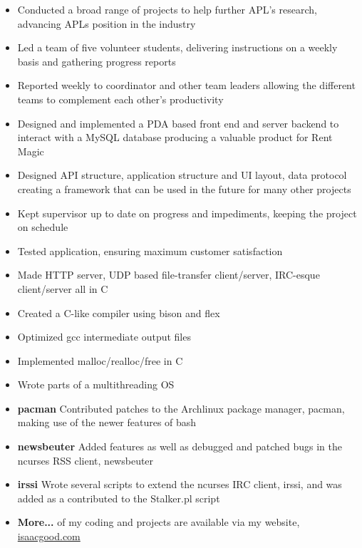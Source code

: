 \documentclass{article}
\begin{document}
      \begin{itemize}
        \item Conducted a broad range of projects to help further APL’s research, advancing APLs position in the industry
        \item Led a team of five volunteer students, delivering instructions on a weekly basis and gathering progress reports
        \item Reported weekly to coordinator and other team leaders allowing the different teams to complement each other's productivity
      \end{itemize}

      \begin{itemize}
        \item Designed and implemented a PDA based front end and server backend to interact with a MySQL database
    producing a valuable product for Rent Magic
        \item Designed API structure, application structure and UI layout, data protocol creating a framework that can be
    used in the future for many other projects
        \item Kept supervisor up to date on progress and impediments, keeping the project on schedule
        \item Tested application, ensuring maximum customer satisfaction
      \end{itemize}

    \begin{itemize}
      \item Made HTTP server, UDP based file-transfer client/server, IRC-esque client/server all in C
      \item Created a C-like compiler using bison and flex
      \item Optimized gcc intermediate output files
      \item Implemented malloc/realloc/free in C
      \item Wrote parts of a multithreading OS
    \end{itemize}

    \begin{itemize}
      \item \textbf{pacman} Contributed patches to the Archlinux package manager, pacman, making use of the newer features of bash
      \item \textbf{newsbeuter} Added features as well as debugged and patched bugs in the ncurses RSS client, newsbeuter
      \item \textbf{irssi} Wrote several scripts to extend the ncurses IRC client, irssi, and was added as a contributed to the Stalker.pl script
      \item \textbf{More...} of my coding and projects are available via my website, \href{http://www.isaacgood.com/}{isaacgood.com}
    \end{itemize}
\end{document}
